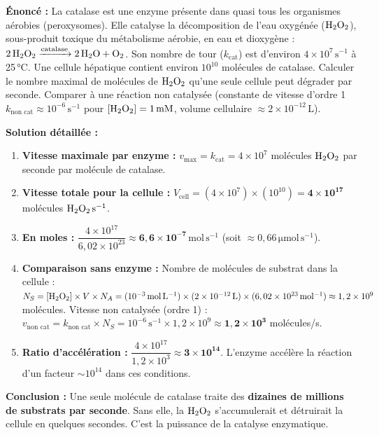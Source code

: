 \documentclass[11pt]{article}
\begin{document}
\begin{exoresolu}
\textbf{Énoncé :} La catalase est une enzyme présente dans quasi tous les organismes aérobies (peroxysomes). Elle catalyse la décomposition de l'eau oxygénée ($\ce{H2O2}$), sous-produit toxique du métabolisme aérobie, en eau et dioxygène : $\ce{2H2O2 ->[catalase] 2H2O + O2}$. Son nombre de tour ($k_{\text{cat}}$) est d'environ $4 \times 10^7\,\mathrm{s^{-1}}$ à 25\,°C. Une cellule hépatique contient environ $10^{10}$ molécules de catalase. Calculer le nombre maximal de molécules de $\ce{H2O2}$ qu'une seule cellule peut dégrader par seconde. Comparer à une réaction non catalysée (constante de vitesse d'ordre 1 $k_{\text{non cat}} \approx 10^{-6}\,\mathrm{s^{-1}}$ pour $[\ce{H2O2}] = 1\,\mathrm{mM}$, volume cellulaire $\approx 2 \times 10^{-12}\,\mathrm{L}$).

\textbf{Solution détaillée :}
\begin{enumerate}
\item \textbf{Vitesse maximale par enzyme :} $v_{\text{max}} = k_{\text{cat}} = 4 \times 10^7$ molécules $\ce{H2O2}$ par seconde par molécule de catalase.
\item \textbf{Vitesse totale pour la cellule :} $V_{\text{cell}} = (4 \times 10^7) \times (10^{10}) = \mathbf{4 \times 10^{17}}$ molécules $\ce{H2O2}\,\mathrm{s^{-1}}$.
\item \textbf{En moles :} $\dfrac{4 \times 10^{17}}{6,02 \times 10^{23}} \approx \mathbf{6,6 \times 10^{-7}\,\mathrm{mol\,s^{-1}}}$ (soit $\approx 0,66\,\mathrm{\mu mol\,s^{-1}}$).
\item \textbf{Comparaison sans enzyme :} 
Nombre de molécules de substrat dans la cellule : $N_S = [\ce{H2O2}] \times V \times N_A = (10^{-3}\,\mathrm{mol\,L^{-1}}) \times (2 \times 10^{-12}\,\mathrm{L}) \times (6,02 \times 10^{23}\,\mathrm{mol^{-1}}) \approx 1,2 \times 10^9$ molécules.
Vitesse non catalysée (ordre 1) : $v_{\text{non cat}} = k_{\text{non cat}} \times N_S = 10^{-6}\,\mathrm{s^{-1}} \times 1,2 \times 10^9 \approx \mathbf{1,2 \times 10^3}$ molécules/s.
\item \textbf{Ratio d'accélération :} $\dfrac{4 \times 10^{17}}{1,2 \times 10^3} \approx \mathbf{3 \times 10^{14}}$. L'enzyme accélère la réaction d'un facteur $\sim 10^{14}$ dans ces conditions.
\end{enumerate}

\textbf{Conclusion :} Une seule molécule de catalase traite des \textbf{dizaines de millions de substrats par seconde}. Sans elle, la $\ce{H2O2}$ s'accumulerait et détruirait la cellule en quelques secondes. C'est la puissance de la catalyse enzymatique.
\end{exoresolu}
\end{document}
